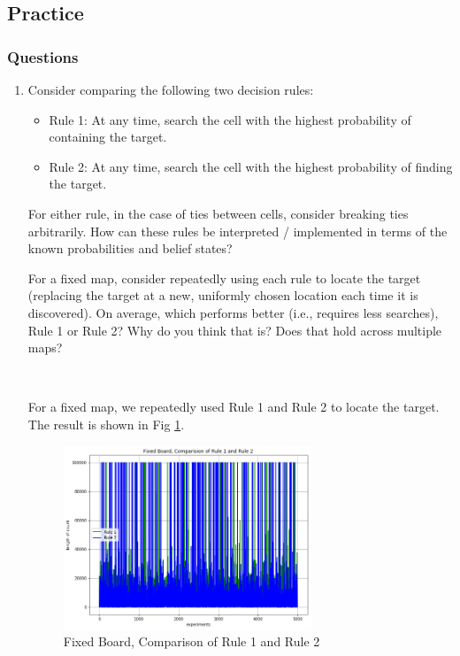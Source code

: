 \documentclass[letter]{article}
\begin{document}
\subsection{Practice}
\label{sec:1-practice}
\subsubsection{Questions}
\label{sec:1-2-questions}
\begin{enumerate}
	
	\item {Consider comparing the following two decision rules:
		\begin{itemize}
			\item {Rule 1: At any time, search the cell with the highest probability of containing the target.}
			\item {Rule 2: At any time, search the cell with the highest probability of finding the target.}
		\end{itemize} 
		\par{For either rule, in the case of ties between cells, consider breaking ties arbitrarily. How can these rules be interpreted / implemented in terms of the known probabilities and belief states?}
		\par{For a fixed map, consider repeatedly using each rule to locate the target (replacing the target at a new,
			uniformly chosen location each time it is discovered). On average, which performs better (i.e., requires less
			searches), Rule 1 or Rule 2? Why do you think that is? Does that hold across multiple maps?}
		} \\
	
	\par{For a fixed map, we repeatedly used Rule 1 and Rule 2 to locate the target. The result is shown in Fig \ref{fig:xzc1}.}
	
	\begin{figure}
		\centering
		\includegraphics[width=0.7\textwidth]{fig/xzc1.png}
		\caption{Fixed Board, Comparison of Rule 1 and Rule 2}
		\label{fig:xzc1}
	\end{figure}
	

\end{enumerate}
\end{document}
